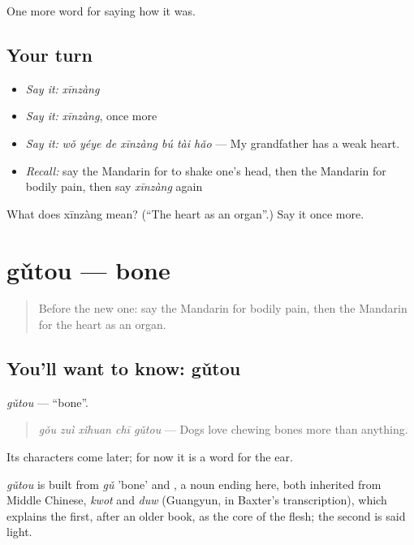 \begin{grammarlens}[title={What you've built}]
One more word for saying how it was.
\end{grammarlens}

\subsection*{Your turn}
\begin{itemize}
\raggedright
  \item \emph{Say it:} \emph{xīnzàng}
  \item \emph{Say it:} \emph{xīnzàng}, once more
  \item \emph{Say it:} \emph{wǒ yéye de xīnzàng bú tài hǎo} — My grandfather has a weak heart.
  \item \emph{Recall:} say the Mandarin for to shake one's head, then the Mandarin for bodily pain, then say \emph{xīnzàng} again
\end{itemize}

\begin{tcolorbox}[breakable,colback=teal!4,colframe=teal!35!black,title={Before you move on}]
What does xīnzàng mean? (\textquotedblleft{}The heart as an organ\textquotedblright{}.) Say it once more.
\end{tcolorbox}
\section[gǔtou]{gǔtou — bone}

\label{lesson:ZH-C477-gutou}



\begin{quote}
Before the new one: say the Mandarin for bodily pain, then the Mandarin for the heart as an organ.
\end{quote}

\subsection*{You'll want to know: gǔtou}
\emph{gǔtou} — \textquotedblleft{}bone\textquotedblright{}.

\begin{quote}
\emph{gǒu zuì xǐhuan chī gǔtou} — Dogs love chewing bones more than anything.
\end{quote}

Its characters come later; for now it is a word for the ear.

\begin{cousinweb}
\emph{gǔtou} is built from \emph{gǔ} 'bone' and , a noun ending here, both inherited from Middle Chinese, \emph{kwot} and \emph{duw} (Guangyun, in Baxter's transcription), which explains the first, after an older book, as the core of the flesh; the second is said light.
\end{cousinweb}

